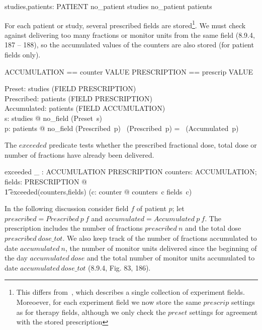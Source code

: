\documentclass{article}
\begin{document}
\begin{axdef}
	studies,patients: \power PATIENT
\where
	no\_patient \notin studies \land no\_patient \notin patients
\end{axdef}
For each patient or study, several prescribed fields are
stored\footnote{This differs from~\cite{jacky90d}, which describes a
single collection of experiment fields.  Moreoever, for each
experiment field we now store the same $prescrip$ settings as for
therapy fields, although we only check the $preset$ settings for
agreement with the stored prescription}.  We must check against
delivering too many fractions or monitor units from the same field
(8.9.4, 187 -- 188), so the accumulated values of the counters are
also stored (for patient fields only).

\begin{zed}
	ACCUMULATION == counter \fun VALUE
\also
 	PRESCRIPTION == prescrip \fun VALUE
\end{zed}

\begin{axdef}	
	Preset: studies \fun (FIELD \pfun PRESCRIPTION) \\
	Prescribed: patients \fun (FIELD \pfun PRESCRIPTION) \\
	Accumulated: patients \fun (FIELD \pfun ACCUMULATION) \\
\where
	\forall s: studies @ no\_field \notin \dom (Preset~s) \\
	\forall p: patients @ no\_field \notin \dom (Prescribed~p)
			\land \dom~(Prescribed~p) = \dom~(Accumulated~p) 
\end{axdef}

The $exceeded$ predicate tests whether the prescribed fractional dose,
total dose or number of fractions have already been delivered.


\begin{axdef}
	exceeded \_ : ACCUMULATION \rel PRESCRIPTION
\where
	\forall counters: ACCUMULATION; fields: PRESCRIPTION @ \\
	\t1 exceeded(counters,fields) \iff (\exists c: counter @ counters~c \geq fields~c)
\end{axdef}
In the following discussion consider field $f$ of patient $p$; let
$prescribed = Prescribed~p~f$ and $accumulated = Accumulated~p~f$.
The prescription includes the number of fractions $prescribed~n$ and
the total dose $prescribed~dose\_tot$.  We also keep track of the
number of fractions accumulated to date $accumulated~n$, the number of
monitor units delivered since the beginning of the day
$accumulated~dose$ and the total number of monitor units accumulated
to date $accumulated~dose\_tot$ (8.9.4, Fig. 83, 186).
\end{document}
